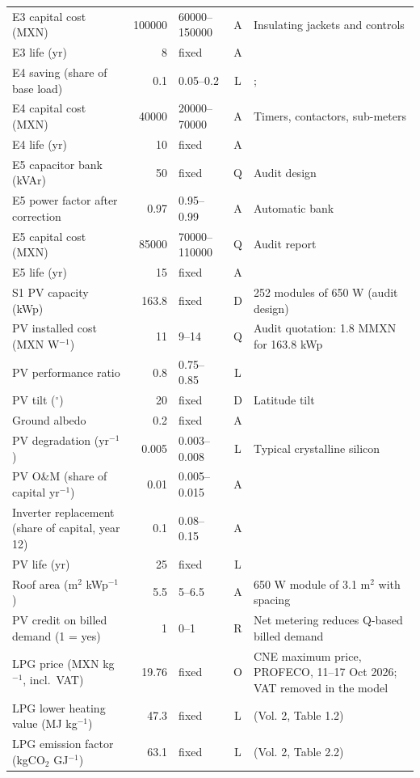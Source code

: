 {\begin{longtable}{p{4.4cm}rlcp{4.0cm}}
E3 capital cost (MXN) & 100000 & 60000--150000 & A & Insulating jackets and controls \\
E3 life (yr) & 8 & fixed & A &  \\
E4 saving (share of base load) & 0.1 & 0.05--0.2 & L & \cite{mouzon2007}; \cite{kara2011} \\
E4 capital cost (MXN) & 40000 & 20000--70000 & A & Timers, contactors, sub-meters \\
E4 life (yr) & 10 & fixed & A &  \\
E5 capacitor bank (kVAr) & 50 & fixed & Q & Audit design \\
E5 power factor after correction & 0.97 & 0.95--0.99 & A & Automatic bank \\
E5 capital cost (MXN) & 85000 & 70000--110000 & Q & Audit report \\
E5 life (yr) & 15 & fixed & A &  \\
S1 PV capacity (kWp) & 163.8 & fixed & D & 252 modules of 650 W (audit design) \\
PV installed cost (MXN W$^{-1}$) & 11 & 9--14 & Q & Audit quotation: 1.8 MMXN for 163.8 kWp \\
PV performance ratio & 0.8 & 0.75--0.85 & L & \cite{reich2012} \\
PV tilt ($^\circ$) & 20 & fixed & D & Latitude tilt \\
Ground albedo & 0.2 & fixed & A &  \\
PV degradation (yr$^{-1}$) & 0.005 & 0.003--0.008 & L & Typical crystalline silicon \\
PV O\&M (share of capital yr$^{-1}$) & 0.01 & 0.005--0.015 & A &  \\
Inverter replacement (share of capital, year 12) & 0.1 & 0.08--0.15 & A &  \\
PV life (yr) & 25 & fixed & L &  \\
Roof area (m$^2$ kWp$^{-1}$) & 5.5 & 5--6.5 & A & 650 W module of 3.1 m$^2$ with spacing \\
PV credit on billed demand (1 = yes) & 1 & 0--1 & R & Net metering reduces Q-based billed demand \\
LPG price (MXN kg$^{-1}$, incl.\ VAT) & 19.76 & fixed & O & CNE maximum price, PROFECO, 11--17 Oct 2026; VAT removed in the model \\
LPG lower heating value (MJ kg$^{-1}$) & 47.3 & fixed & L & \cite{ipcc2006} (Vol. 2, Table 1.2) \\
LPG emission factor (kgCO$_2$ GJ$^{-1}$) & 63.1 & fixed & L & \cite{ipcc2006} (Vol. 2, Table 2.2) \\

\end{longtable}}
